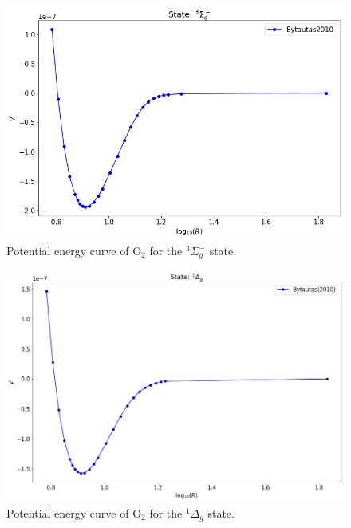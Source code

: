 \documentclass[12pt]{article}
\begin{document}
\iffalse %
\begin{figure}[h]
    \centering
    \includegraphics[scale=0.5]{img/O2_3sigmagminus_Bytautas(2010).png}
    \caption{Potential energy curve of O$_2$ for the $^3\Sigma^-_g$ state.}
    \label{fig:o21}
\end{figure}
\begin{figure}[h]
    \centering
    \includegraphics[scale=0.5]{img/O2_1deltag_Bytautas(2010).png}
    \caption{Potential energy curve of O$_2$ for the $^1\Delta_g$ state.}
    \label{fig:o22}
\end{figure}
\end{document}
